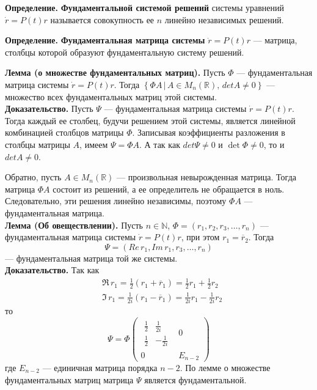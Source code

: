 \noindent \textbf{Определение.} \textbf{Фундаментальной системой решений} системы уравнений $\dot{r} = P(t)r$ называется совокупность ее $n$ линейно независимых решений.

\noindent \textbf{Определение.} \textbf{Фундаментальная матрица системы} $\dot{r} = P(t)r$ --- матрица, столбцы которой образуют фундаментальную систему решений.

\noindent \textbf{Лемма (о множестве фундаментальных матриц).} Пусть $\Phi$ --- фундаментальная матрица системы $\dot{r} = P(t)r$. Тогда $\left\{\Phi A \, | \, A \in M_n(\mathbb{R}), \, detA \neq 0 \right\}$ --- множество всех фундаментальных матриц этой системы.\\

\noindent \textbf{Доказательство.} Пусть $\Psi$ --- фундаментальная матрица системы $\dot{r} = P(t)r$. Тогда каждый ее столбец, будучи решением этой системы, является линейной комбинацией столбцов матрицы $\Phi$. Записывая коэффициенты разложения в столбцы матрицы $A$, имеем $\Psi = \Phi A$. А так как $det \Psi \neq 0$ и $\det \Phi \neq 0$, то и $det A \neq 0$.

Обратно, пусть $A \in M_n(\mathbb{R})$ --- произвольная невырожденная матрица. Тогда матрица $\Phi A$ состоит из решений, а ее определитель не обращается в ноль. Следовательно, эти решения линейно независимы, поэтому $\Phi A$ --- фундаментальная матрица.\\

\noindent \textbf{Лемма (Об овеществлении).} Пусть $n \in \mathbb{N}$, $\Phi = (r_1,r_2,r_3,\ldots,r_n)$ --- фундаментальная матрица системы $\dot{r} = P(t)r$, при этом $r_1 = \overline{r}_2$. Тогда
\begin{equation*}
    \Psi = (Re\,r_1, Im\,r_1, r_3, \ldots, r_n)
\end{equation*}
--- фундаментальная матрица той же системы.\\

\noindent \textbf{Доказательство.} Так как
\begin{equation*}
    \begin{aligned}
         & \Re\, r_1 = \frac{1}{2}(r_1 + \overline{r}_1) = \frac{1}{2}r_1 + \frac{1}{2}r_2   \\
         & \Im\,r_1 = \frac{1}{2i}(r_1 - \overline{r}_1) = \frac{1}{2i}r_1 - \frac{1}{2i}r_2
    \end{aligned}
\end{equation*}
то
\begin{equation*}
    \Psi = \Phi \begin{pmatrix}
        \begin{matrix}
            \frac{1}{2} & \frac{1}{2i}  \\
            \frac{1}{2} & -\frac{1}{2i}
        \end{matrix} & 0       \\
        0                          & E_{n-2}
    \end{pmatrix}
\end{equation*}
где $E_{n-2}$ --- единичная матрица порядка $n - 2$. По лемме о множестве фундаментальных матриц матрица $\Psi$ является фундаментальной.

